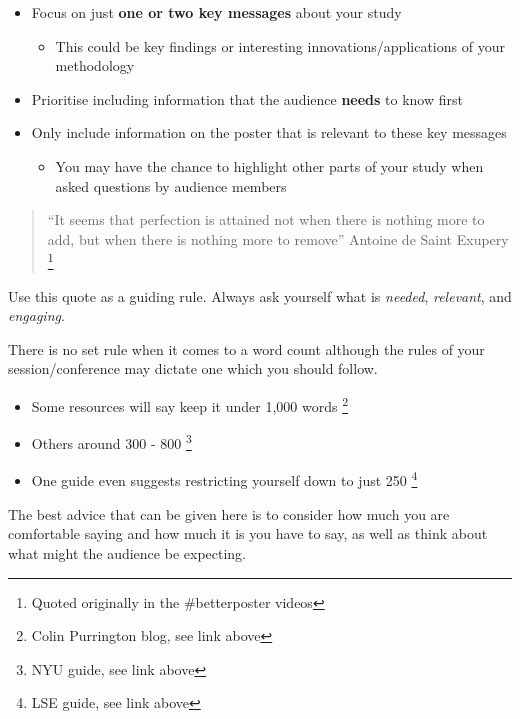 \documentclass[
]{book}
\providecommand{\tightlist}{%
  \setlength{\itemsep}{0pt}\setlength{\parskip}{0pt}}
\begin{document}
\begin{itemize}
\tightlist
\item
  Focus on just \textbf{one or two key messages} about your study

  \begin{itemize}
  \tightlist
  \item
    This could be key findings or interesting innovations/applications of your methodology
  \end{itemize}
\item
  Prioritise including information that the audience \textbf{needs} to know first
\item
  Only include information on the poster that is relevant to these key messages

  \begin{itemize}
  \tightlist
  \item
    You may have the chance to highlight other parts of your study when asked questions by audience members
  \end{itemize}
\end{itemize}

\begin{quote}
``It seems that perfection is attained not when there is nothing more to add, but when there is nothing more to remove'' Antoine de Saint Exupery \footnote{Quoted originally in the \#betterposter videos}
\end{quote}

Use this quote as a guiding rule. Always ask yourself what is \emph{needed}, \emph{relevant}, and \emph{engaging}.

There is no set rule when it comes to a word count although the rules of your session/conference may dictate one which you should follow.

\begin{itemize}
\tightlist
\item
  Some resources will say keep it under 1,000 words \footnote{Colin Purrington blog, see link above}
\item
  Others around 300 - 800 \footnote{NYU guide, see link above}
\item
  One guide even suggests restricting yourself down to just 250 \footnote{LSE guide, see link above}
\end{itemize}

The best advice that can be given here is to consider how much you are comfortable saying and how much it is you have to say, as well as think about what might the audience be expecting.
\end{document}
